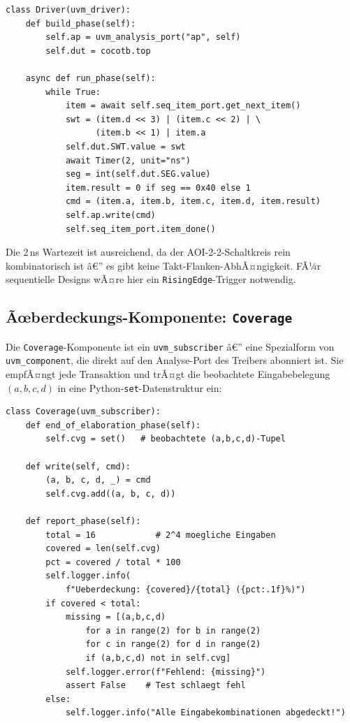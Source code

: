 ﻿\documentclass[12pt,a4paper]{report}
\begin{document}
\begin{lstlisting}[style=pythonstyle, caption={Treiber-Logik: DUT-Ansteuerung und Ergebnis-Erfassung}]
class Driver(uvm_driver):
    def build_phase(self):
        self.ap = uvm_analysis_port("ap", self)
        self.dut = cocotb.top

    async def run_phase(self):
        while True:
            item = await self.seq_item_port.get_next_item()
            swt = (item.d << 3) | (item.c << 2) | \
                  (item.b << 1) | item.a
            self.dut.SWT.value = swt
            await Timer(2, unit="ns")
            seg = int(self.dut.SEG.value)
            item.result = 0 if seg == 0x40 else 1
            cmd = (item.a, item.b, item.c, item.d, item.result)
            self.ap.write(cmd)
            self.seq_item_port.item_done()
\end{lstlisting}

Die 2\,ns Wartezeit ist ausreichend, da der AOI-2-2-Schaltkreis rein
kombinatorisch ist â€” es gibt keine Takt-Flanken-AbhÃ¤ngigkeit. FÃ¼r
sequentielle Designs wÃ¤re hier ein \texttt{RisingEdge}-Trigger notwendig.

\subsection{Ãœberdeckungs-Komponente: \texttt{Coverage}}
\label{sssec:coverage_comp}

Die \texttt{Coverage}-Komponente ist ein \texttt{uvm\_subscriber} â€” eine
Spezialform von \texttt{uvm\_component}, die direkt auf den Analyse-Port des
Treibers abonniert ist. Sie empfÃ¤ngt jede Transaktion und trÃ¤gt die beobachtete
Eingabebelegung $(a, b, c, d)$ in eine Python-\texttt{set}-Datenstruktur ein:

\begin{lstlisting}[style=pythonstyle, caption={\texttt{Coverage}: Ãœberdeckungs-Tracking und Berichterstattung}]
class Coverage(uvm_subscriber):
    def end_of_elaboration_phase(self):
        self.cvg = set()   # beobachtete (a,b,c,d)-Tupel

    def write(self, cmd):
        (a, b, c, d, _) = cmd
        self.cvg.add((a, b, c, d))

    def report_phase(self):
        total = 16            # 2^4 moegliche Eingaben
        covered = len(self.cvg)
        pct = covered / total * 100
        self.logger.info(
            f"Ueberdeckung: {covered}/{total} ({pct:.1f}%)")
        if covered < total:
            missing = [(a,b,c,d)
                for a in range(2) for b in range(2)
                for c in range(2) for d in range(2)
                if (a,b,c,d) not in self.cvg]
            self.logger.error(f"Fehlend: {missing}")
            assert False    # Test schlaegt fehl
        else:
            self.logger.info("Alle Eingabekombinationen abgedeckt!")
\end{lstlisting}
\end{document}
